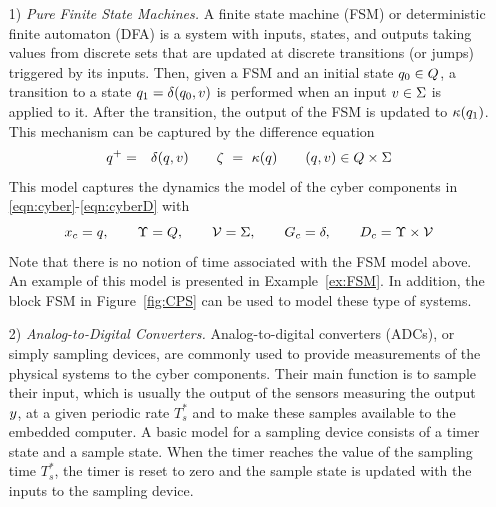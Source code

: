 \documentclass{article}
\begin{document}
\begin{enumerate}
\item[1)] {\em Pure Finite State Machines.}
A finite state machine (FSM) or deterministic finite automaton (DFA) is a system with
inputs, states, and outputs taking values from discrete sets 
that are updated at discrete transitions (or jumps) triggered by its inputs. 
Then, given a FSM and an initial state $q_0 \in Q$,  
a transition to a state $q_1 = \delta(q_0,v)$ is performed
when an input $v \in \Sigma$ is applied to it.
After the transition, the output of the FSM is updated to $\kappa(q_1)$.
This mechanism can be captured by the difference equation
\begin{eqnarray}\label{eqn:FSMmodel}
  \xlogic^+ & = & \delta(\xlogic,\uc)  \qquad \yc \ 
              = \ \hc(\xlogic) \qquad (\xlogic,\uc) \in \xlogicSpace \times \Sigma
\end{eqnarray}
This model captures the dynamics
the model of the cyber components 
in \eqref{eqn:cyber}-\eqref{eqn:cyberD}
with
$$
  x_c = q, \qquad \Upsilon = Q, \qquad 
  {\cal V} = \Sigma, \qquad G_c = \delta, \qquad D_c = \Upsilon\times{\cal V}
$$
Note that there is no notion of time associated with the FSM model above. 
An example of this model is presented in Example~\ref{ex:FSM}.
In addition, the block FSM in Figure~\ref{fig:CPS} can be used to model these type of systems.
\medskip

\item[2)] {\em Analog-to-Digital Converters.}
Analog-to-digital converters (ADCs),  or simply sampling devices,
are commonly used to provide measurements of the physical systems
to the cyber components. Their main
function is to sample their input, which is usually the output of the sensors measuring
the output $y$, at a given periodic rate $T^*_s$ and to make these samples
available to the embedded computer. A basic model for a sampling device
consists of a timer state and a sample state.  When the timer reaches
the value of the sampling time $T^*_s$, the timer is reset to zero and
the sample state is updated with the inputs to the sampling device. 


\end{enumerate}
\end{document}
